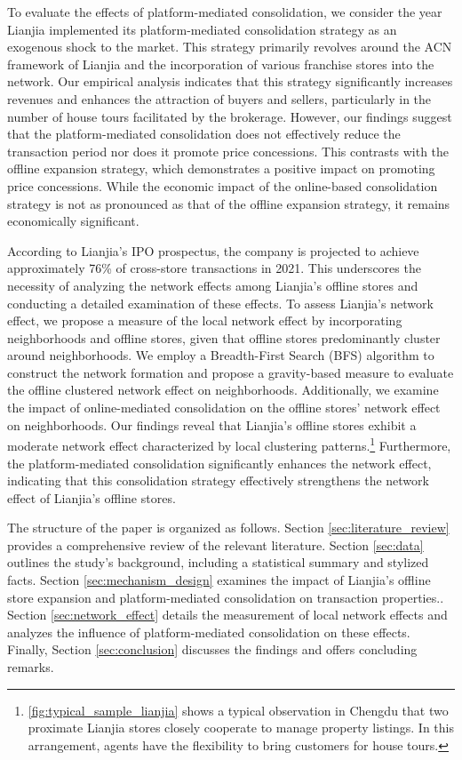\documentclass[11pt]{article}
\begin{document}
To evaluate the effects of platform-mediated consolidation, we consider the year Lianjia implemented its platform-mediated consolidation strategy as an exogenous shock to the market. This strategy primarily revolves around the ACN framework of Lianjia and the incorporation of various franchise stores into the network. Our empirical analysis indicates that this strategy significantly increases revenues and enhances the attraction of buyers and sellers, particularly in the number of house tours facilitated by the brokerage. However, our findings suggest that the platform-mediated consolidation does not effectively reduce the transaction period nor does it promote price concessions. This contrasts with the offline expansion strategy, which demonstrates a positive impact on promoting price concessions. While the economic impact of the online-based consolidation strategy is not as pronounced as that of the offline expansion strategy, it remains economically significant.

According to Lianjia's IPO prospectus, the company is projected to achieve approximately 76\% of cross-store transactions in 2021. This underscores the necessity of analyzing the network effects among Lianjia's offline stores and conducting a detailed examination of these effects. To assess Lianjia's network effect, we propose a measure of the local network effect by incorporating neighborhoods and offline stores, given that offline stores predominantly cluster around neighborhoods. We employ a Breadth-First Search (BFS) algorithm to construct the network formation and propose a gravity-based measure to evaluate the offline clustered network effect on neighborhoods. Additionally, we examine the impact of online-mediated consolidation on the offline stores' network effect on neighborhoods. Our findings reveal that Lianjia's offline stores exhibit a moderate network effect characterized by local clustering patterns.\footnote{\ref{fig:typical_sample_lianjia} shows a typical observation in Chengdu that two proximate Lianjia stores closely cooperate to manage property listings. In this arrangement, agents have the flexibility to bring customers for house tours.} Furthermore, the platform-mediated consolidation significantly enhances the network effect, indicating that this consolidation strategy effectively strengthens the network effect of Lianjia's offline stores.

The structure of the paper is organized as follows. Section \ref{sec:literature_review} provides a comprehensive review of the relevant literature. Section \ref{sec:data} outlines the study's background, including a statistical summary and stylized facts. Section \ref{sec:mechanism_design} examines the impact of Lianjia's offline store expansion and platform-mediated consolidation on transaction properties.. Section \ref{sec:network_effect} details the measurement of local network effects and analyzes the influence of platform-mediated consolidation on these effects. Finally, Section \ref{sec:conclusion} discusses the findings and offers concluding remarks.
\end{document}
